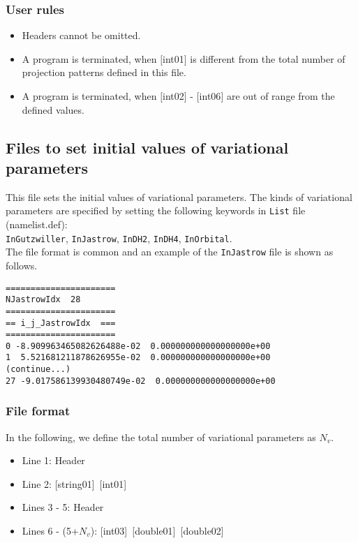 \subsubsection{User rules}
\begin{itemize}
\item Headers cannot be omitted. 
\item A program is terminated, when $[$int01$]$ is different from the total number of projection patterns defined in this file.
\item A program is terminated, when $[$int02$]$ - $[$int06$]$ are out of range from the defined values.
\end{itemize}

\newpage
\subsection{Files to set initial values of variational parameters}
\label{Subsec:InputParam}
This file sets the initial values of variational parameters.
The kinds of variational parameters are specified by setting the following keywords in \verb|List| file (namelist.def):\\
\verb|InGutzwiller|, \verb|InJastrow|, \verb|InDH2|, \verb|InDH4|, \verb|InOrbital|.\\
The file format is common and an example of the \verb|InJastrow| file is shown as follows.

\begin{minipage}{12.5cm}
\begin{screen}
\begin{verbatim}
======================
NJastrowIdx  28
====================== 
== i_j_JastrowIdx  ===
====================== 
0 -8.909963465082626488e-02  0.000000000000000000e+00
1  5.521681211878626955e-02  0.000000000000000000e+00
(continue...)
27 -9.017586139930480749e-02  0.000000000000000000e+00
\end{verbatim}
\end{screen}
\end{minipage}

\subsubsection{File format}
In the following, we define the total number of variational parameters as $N_v$.
 \begin{itemize}
   \item  Line 1: Header
   \item  Line 2: [string01]~[int01]
   \item  Lines 3 - 5:  Header
   \item  Lines 6 - (5+$N_v$): [int03]~[double01]~[double02]
  \end{itemize}

